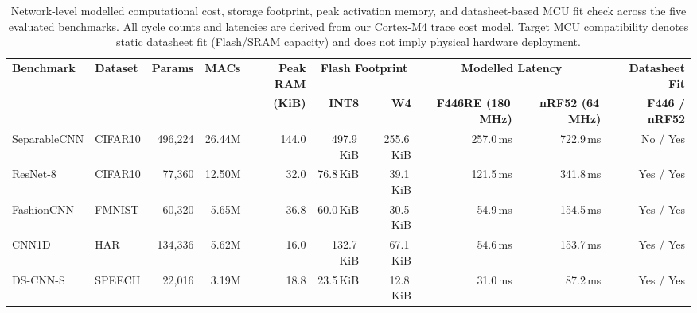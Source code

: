 \begin{table}[t]
\centering
\caption{Network-level modelled computational cost, storage footprint, peak activation memory, and datasheet-based MCU fit check across the five evaluated benchmarks. All cycle counts and latencies are derived from our Cortex-M4 trace cost model. Target MCU compatibility denotes static datasheet fit (Flash/SRAM capacity) and does not imply physical hardware deployment.}
\label{tab:network_costs}
\footnotesize
\setlength{\tabcolsep}{4.5pt}
\begin{tabular}{llrrrrrrrr}
\toprule
\textbf{Benchmark} & \textbf{Dataset} & \textbf{Params} & \textbf{MACs} & \textbf{Peak RAM} & \multicolumn{2}{c}{\textbf{Flash Footprint}} & \multicolumn{2}{c}{\textbf{Modelled Latency}} & \textbf{Datasheet Fit} \\
\cmidrule(lr){6-7} \cmidrule(lr){8-9}
 & & & & \textbf{(KiB)} & \textbf{INT8} & \textbf{W4} & \textbf{F446RE (180\,MHz)} & \textbf{nRF52 (64\,MHz)} & \textbf{F446 / nRF52} \\
\midrule
SeparableCNN & CIFAR10 & 496,224 & 26.44M & 144.0 & 497.9\,KiB & 255.6\,KiB & 257.0\,ms & 722.9\,ms & No / Yes \\
ResNet-8 & CIFAR10 & 77,360 & 12.50M & 32.0 & 76.8\,KiB & 39.1\,KiB & 121.5\,ms & 341.8\,ms & Yes / Yes \\
FashionCNN & FMNIST & 60,320 & 5.65M & 36.8 & 60.0\,KiB & 30.5\,KiB & 54.9\,ms & 154.5\,ms & Yes / Yes \\
CNN1D & HAR & 134,336 & 5.62M & 16.0 & 132.7\,KiB & 67.1\,KiB & 54.6\,ms & 153.7\,ms & Yes / Yes \\
DS-CNN-S & SPEECH & 22,016 & 3.19M & 18.8 & 23.5\,KiB & 12.8\,KiB & 31.0\,ms & 87.2\,ms & Yes / Yes \\
\bottomrule
\end{tabular}
\end{table}
